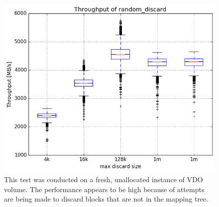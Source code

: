 \documentclass[
  color, %
  table, %
  lof,   %
  lot,   %
]{fithesis3}
\begin{document}
\begin{figure}
\centering
\includegraphics[width=\textwidth]{../results/discards/unalloc_VDO/report/random_discard1_compare_boxplots}
\caption[Performance of discard operation on an unnallocated VDO volume.]{This test was conducted on a fresh, unallocated instance of VDO volume. The performance appears to be high because of attempts are being made to discard blocks that are not in the mapping tree.}
\label{fig:discard-unalloc}
\end{figure}






\printbibliography[heading=bibintoc]
\end{document}

